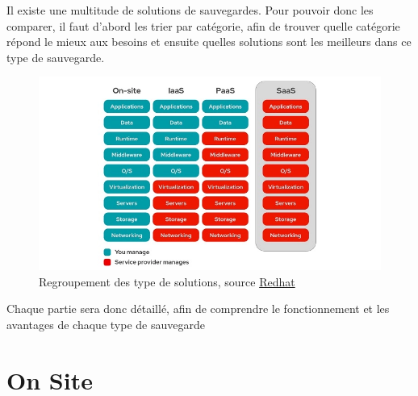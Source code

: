\documentclass[pfe]{tnreport} %
\begin{document}
Il existe une multitude de solutions de sauvegardes.\newline
Pour pouvoir donc les comparer, il faut d'abord les trier par catégorie, afin de trouver quelle catégorie répond le mieux aux besoins et ensuite quelles solutions sont les meilleurs dans ce type de sauvegarde. \newline
\begin{figure}[h]
  \centering
  \includegraphics[width=18cm]{figures/comparatif_sauvegarde.png}
  \caption{Regroupement des type de solutions, source 
  \href{https://www.redhat.com/en/topics/cloud-computing/public-cloud-vs-private-cloud-and-hybrid-cloud}{Redhat}}
  \label{fig:famille}
\end{figure}

Chaque partie sera donc détaillé, afin de comprendre le fonctionnement et les avantages de chaque type de sauvegarde

\section{On Site}
\end{document}
